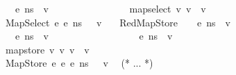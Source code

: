 \begin{isabellebody}
\ \ \ \ \ \ \ \ \ \ \ \ \ \ \ \ {\isasymLambda}{\isacharcomma}{\kern0pt}{\isasymGamma}{\isacharcomma}{\kern0pt}{\isasymOmega}\ {\isasymturnstile}\ {\isasymlangle}e{}{\isacharcomma}{\kern0pt}\ n{\isacharunderscore}{\kern0pt}s{\isasymrangle}\ {\isasymDown}\ v{}{\isacharsemicolon}{\kern0pt}\isanewline
\ \ \ \ \ \ \ \ \ \ \ \ \ \ \ \ map{\isacharunderscore}{\kern0pt}select\ v{}\ v{}\ {\isacharequal}{\kern0pt}\ v{\isasymrbrakk}\ {\isasymLongrightarrow}\isanewline
\ \ \ \ \ \ \ \ \ \ \ \ \ {\isasymLambda}{\isacharcomma}{\kern0pt}{\isasymGamma}{\isacharcomma}{\kern0pt}{\isasymOmega}\ {\isasymturnstile}\ {\isasymlangle}\ MapSelect\ e{}\ e{}{\isacharcomma}{\kern0pt}\ n{\isacharunderscore}{\kern0pt}s\ {\isasymrangle}\ {\isasymDown}\ v{\isachardoublequoteclose}\isanewline
\ \ {\isacharbar}{\kern0pt}\ RedMapStore{\isacharcolon}{\kern0pt}\ {\isachardoublequoteopen}{\isasymlbrakk}\ {\isasymLambda}{\isacharcomma}{\kern0pt}{\isasymGamma}{\isacharcomma}{\kern0pt}{\isasymOmega}\ {\isasymturnstile}\ {\isasymlangle}e{}{\isacharcomma}{\kern0pt}\ n{\isacharunderscore}{\kern0pt}s{\isasymrangle}\ {\isasymDown}\ v{}{\isacharsemicolon}{\kern0pt}\isanewline
\ \ \ \ \ \ \ \ \ \ \ \ \ \ \ \ {\isasymLambda}{\isacharcomma}{\kern0pt}{\isasymGamma}{\isacharcomma}{\kern0pt}{\isasymOmega}\ {\isasymturnstile}\ {\isasymlangle}e{}{\isacharcomma}{\kern0pt}\ n{\isacharunderscore}{\kern0pt}s{\isasymrangle}\ {\isasymDown}\ v{}{\isacharsemicolon}{\kern0pt}\isanewline
\ \ \ \ \ \ \ \ \ \ \ \ \ \ \ \ {\isasymLambda}{\isacharcomma}{\kern0pt}{\isasymGamma}{\isacharcomma}{\kern0pt}{\isasymOmega}\ {\isasymturnstile}\ {\isasymlangle}e{}{\isacharcomma}{\kern0pt}\ n{\isacharunderscore}{\kern0pt}s{\isasymrangle}\ {\isasymDown}\ v{}{\isacharsemicolon}{\kern0pt}\isanewline
\ \ \ \ \ \ \ \ \ \ \ \ \ \ \ \ map{\isacharunderscore}{\kern0pt}store\ v{}\ v{}\ v{}\ {\isacharequal}{\kern0pt}\ v{\isasymrbrakk}\ {\isasymLongrightarrow}\isanewline
\ \ \ \ \ \ \ \ \ \ \ \ \ {\isasymLambda}{\isacharcomma}{\kern0pt}{\isasymGamma}{\isacharcomma}{\kern0pt}{\isasymOmega}\ {\isasymturnstile}\ {\isasymlangle}\ MapStore\ e{}\ e{}\ e{}{\isacharcomma}{\kern0pt}\ n{\isacharunderscore}{\kern0pt}s\ {\isasymrangle}\ {\isasymDown}\ v{\isachardoublequoteclose}\isanewline
\ \ (* ... *) \isanewline
\end{isabellebody}



